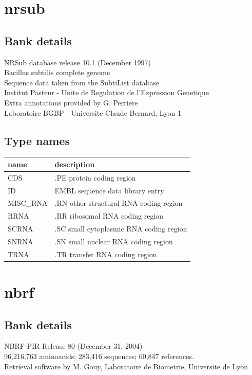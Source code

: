 \documentclass{article}
\begin{document}
\begin{Schunk}
\section{ nrsub }
\subsection{Bank details}
NRSub database release 10.1 (December 1997)\\
Bacillus subtilis complete genome\\
Sequence data taken from the SubtiList database\\
Institut Pasteur - Unite de Regulation de l'Expression Genetique\\
Extra annotations provided by G. Perriere\\
Laboratoire BGBP - Universite Claude Bernard, Lyon 1

\subsection{Type names}
\noindent\begin{tabular}{ll}
\hline \hline
name & description\\
\hline
CDS & .PE protein coding region \\
ID & EMBL sequence data library entry \\
MISC\_RNA & .RN other structural RNA coding region \\
RRNA & .RR ribosomal RNA coding region \\
SCRNA & .SC small cytoplasmic RNA coding region \\
SNRNA & .SN small nuclear RNA coding region \\
TRNA & .TR transfer RNA coding region \\
\hline \hline
\end{tabular}

\section{ nbrf }
\subsection{Bank details}
NBRF-PIR Release 80 (December 31, 2004)\\
96,216,763 aminoacids; 283,416 sequences; 60,847 references.\\
Retrieval software by M. Gouy, Laboratoire de Biometrie, Universite de Lyon


\end{Schunk}
\end{document}
